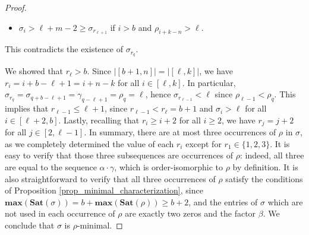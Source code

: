 \documentclass[10pt,a4paper]{amsart}
\newcommand{\Sat}{\mathbf{Sat}}
\renewcommand{\max}{\mathbf{max}}
\begin{document}
\begin{proof}
\begin{itemize}
\begin{itemize}
            \item $\sigma_i > \ell+m-2 \geq \sigma_{r_{\ell+1}}$ if $i > b$ and $\rho_{i+k-n} > \ell$.
        \end{itemize}
        This contradicts the existence of $\sigma_{r_q}$.
    \end{itemize}
    We showed that $r_\ell > b$. Since $|[b+1,n]| = |[\ell,k]|$, we have ${r_i = i+b-\ell+1 = i+n-k}$ for all $i \in [\ell,k]$. In particular, $\sigma_{r_q} = \sigma_{q+b-\ell+1} = \gamma_{q-\ell+1} = \rho_q = \ell$, hence ${\sigma_{r_{\ell-1}} < \ell}$ since ${\rho_{\ell-1} < \rho_q}$. This implies that $r_{\ell-1} \leq \ell+1$, since $r_{\ell-1} < r_\ell = b+1$ and $\sigma_i > \ell$ for all ${i \in [\ell+2,b]}$. Lastly, recalling that $r_i \geq i+2$ for all $i \geq 2$, we have ${r_j = j+2}$ for all $j \in [2,\ell-1]$. In summary, there are at most three occurrences of $\rho$ in $\sigma$, as we completely determined the value of each $r_i$ except for $r_1 \in \{1,2,3\}$. It is easy to verify that those three subsequences are occurrences of $\rho$: indeed, all three are equal to the sequence $\alpha \cdot \gamma$, which is order-isomorphic to $\rho$ by definition. It is also straightforward to verify that all three occurrences of $\rho$ satisfy the conditions of Proposition \ref{prop_minimal_characterization}, since ${\max(\Sat(\sigma)) = b+\max(\Sat(\rho)) \geq b+2}$, and the entries of $\sigma$ which are not used in each occurrence of $\rho$ are exactly two zeros and the factor $\beta$. We conclude that $\sigma$ is $\rho$-minimal.
\end{proof}
\end{document}

